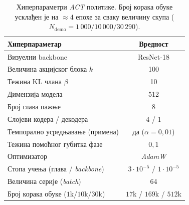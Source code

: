 \documentclass[12pt, a4paper]{article}
\begin{document}
\begin{table}[htbp]
    \caption{Хиперпараметри \textit{ACT} политике. Број корака обуке усклађен је на $\approx 4$ епохе за сваку величину скупа ($N_{\mathrm{demo}}=1\,000/10\,000/30\,290$).}
    \label{tab:act_hparams}
    \centering
    \begin{tabular}{l c}
        \toprule
        Хиперпараметар & Вредност \\
        \midrule
        Визуелни backbone & ResNet-18 \\
        Величина акцијског блока $k$ & 100 \\
        Тежина KL члана $\beta$ & 10 \\
        Димензија модела & 512 \\
        Број глава пажње & 8 \\
        Слојеви кодера / декодера & 4 / 1 \\
        Темпорално усредњавање (примена) & да ($\alpha = 0{,}01$) \\
        Тежина помоћног губитка фазе & $0{,}1$ \\
        Оптимизатор & \textit{AdamW} \\
        Стопа учења (глава / \textit{backbone}) & $3\cdot 10^{-5}$ / $1\cdot 10^{-5}$ \\
        Величина серије (\textit{batch}) & 64 \\
        Број корака обуке ($1$k/$10$k/$30$k) & $17$k / $169$k / $512$k \\
        \bottomrule
    \end{tabular}
\end{table}
\end{document}
